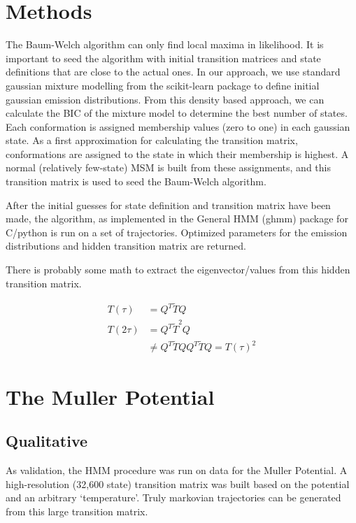 \documentclass[10pt]{article}
\begin{document}
\section{Methods}

The Baum-Welch algorithm can only find local maxima in likelihood. It is important to seed
the algorithm with initial transition matrices and state definitions that are close to the
actual ones. In our approach, we use standard gaussian mixture modelling from the scikit-learn
package to define initial gaussian emission distributions. From this density based
approach, we can calculate the BIC of the mixture model to determine the best number of states.
Each conformation is assigned membership values (zero to one) in each gaussian state. As a first approximation
for calculating the transition matrix, conformations are assigned to the state in which their membership
is highest. A normal (relatively few-state) MSM is built from these assignments, and this transition
matrix is used to seed the Baum-Welch algorithm.

After the initial guesses for state definition and transition matrix have been made, the algorithm,
as implemented in the General HMM (ghmm) package for C/python
is run on a set of trajectories. Optimized parameters for the emission distributions and
hidden transition matrix are returned.

There is probably some math to extract the eigenvector/values from this hidden transition matrix.

\begin{subequations}
\begin{align}
T(\tau) &= Q^T \widetilde{T} Q \\
T(2\tau) &= Q^T \widetilde{T}^2 Q \\
& \neq Q^T \widetilde{T} Q Q^T \widetilde{T} Q = T(\tau)^2
\end{align}
\end{subequations}

\section{The Muller Potential}

\subsection{Qualitative}

As validation, the HMM procedure was run on data for the Muller Potential. A high-resolution (32,600 state)
 transition matrix was built based on the potential and an arbitrary `temperature'. Truly
 markovian trajectories can be generated from this large transition matrix. 
 
\end{document}
